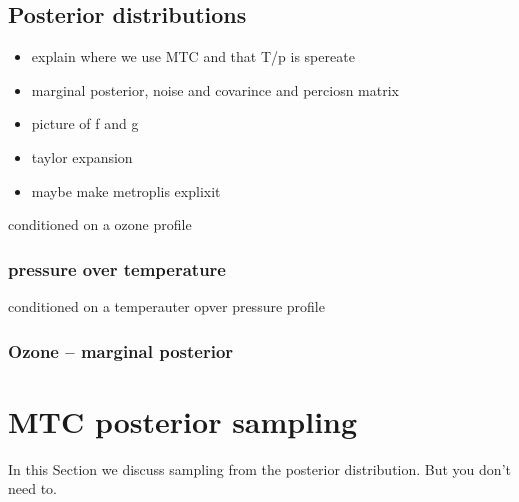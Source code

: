 \subsection{Posterior distributions}
\begin{itemize}
	\item explain where we use MTC and that T/p is spereate
	\item marginal posterior, noise and covarince and perciosn matrix
	\item picture of f and g
	\item taylor expansion
	\item maybe make  metroplis explixit
\end{itemize}
conditioned on a ozone profile
\subsubsection{pressure over temperature}

conditioned on a temperauter opver pressure profile
\subsubsection{Ozone -- marginal posterior}
\section{MTC posterior sampling}
\label{sec:postsamp}
In this Section we discuss sampling from the posterior distribution. But you don't need to.
